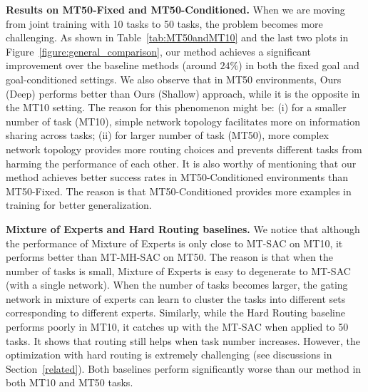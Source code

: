 \documentclass{article}
\begin{document}
\textbf{Results on MT50-Fixed and MT50-Conditioned.} When we are moving from joint training with 10 tasks to 50 tasks, the problem becomes more challenging. As shown in Table~\ref{tab:MT50andMT10} and the last two plots in Figure~\ref{figure:general_comparison}, our method achieves a significant improvement over the baseline methods (around $24\%$) in both the fixed goal and goal-conditioned settings. We also observe that in MT50 environments, Ours (Deep) performs better than Ours (Shallow) approach, while it is the opposite in the MT10 setting. The reason for this phenomenon might be: (i) for a smaller number of task (MT10), simple network topology facilitates more on information sharing across tasks; (ii) for larger number of task (MT50), more complex network topology provides more routing choices and prevents different tasks from harming the performance of each other. It is also worthy of mentioning that our method achieves better success rates in MT50-Conditioned environments than MT50-Fixed. The reason is that MT50-Conditioned provides more examples in training for better generalization.

\textbf{Mixture of Experts and Hard Routing baselines.} We notice that although the performance of Mixture of Experts is only close to MT-SAC on MT10, it performs better than MT-MH-SAC on MT50. The reason is that when the number of tasks is small, Mixture of Experts is easy to degenerate to MT-SAC (with a single network). When the number of tasks becomes larger, the gating network in mixture of experts can learn to cluster the tasks into different sets corresponding to different experts. Similarly, while the Hard Routing baseline performs poorly in MT10, it catches up with the MT-SAC when applied to 50 tasks. It shows that routing still helps when task number increases. However, the optimization with hard routing is extremely challenging (see discussions in Section~\ref{related}). Both baselines perform significantly worse than our method in both MT10 and MT50 tasks. 
\end{document}
